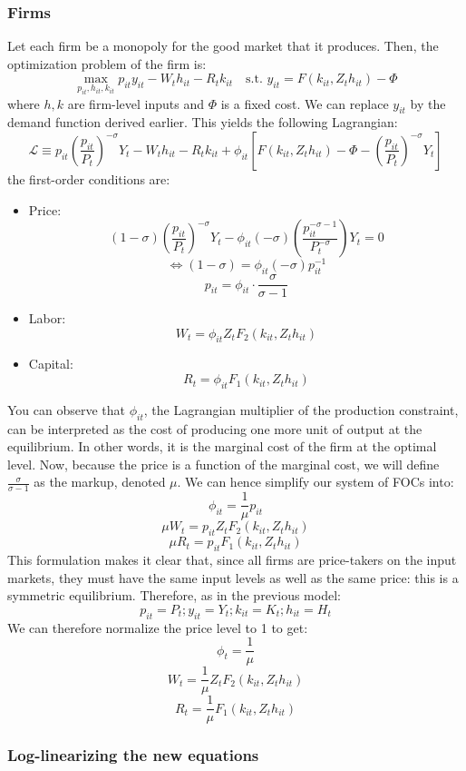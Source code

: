 \documentclass[12pt]{report}
\begin{document}
\subsubsection{Firms}

Let each firm be a monopoly for the good market that it produces. Then, the optimization problem of the firm is: $$\max_{p_{it},h_{it},k_{it}} p_{it}y_{it} - W_th_{it} - R_tk_{it} \text{ }\text{ s.t. } y_{it} = F(k_{it}, Z_th_{it}) - \Phi $$ where $h,k$ are firm-level inputs and $\Phi$ is a fixed cost. We can replace $y_{it}$ by the demand function derived earlier. This yields the following Lagrangian: $$\mathcal{L}\equiv p_{it}\left(\frac{p_{it}}{P_t}\right)^{-\sigma}Y_t - W_th_{it} - R_tk_{it} +\phi_{it}\left[F(k_{it}, Z_th_{it}) - \Phi - \left(\frac{p_{it}}{P_t}\right)^{-\sigma}Y_t\right] $$
the first-order conditions are:\begin{itemize}
\item Price: $$(1 - \sigma)\left(\frac{p_{it}}{P_t}\right)^{-\sigma}Y_t - \phi_{it}(-\sigma)\left(\frac{p_{it}^{-\sigma - 1}}{P_t^{-\sigma}}\right)Y_t = 0 $$ $$\Leftrightarrow (1-\sigma) = \phi_{it}(-\sigma)p_{it}^{-1} $$ $$ p_{it} = \phi_{it}\cdot\frac{\sigma}{\sigma - 1} $$
\item Labor: $$W_t = \phi_{it}Z_tF_2(k_{it}, Z_th_{it}) $$
\item Capital: $$R_t = \phi_{it}F_1(k_{it}, Z_th_{it}) $$
\end{itemize} 
You can observe that $\phi_{it}$, the Lagrangian multiplier of the production constraint, can be interpreted as the cost of producing one more unit of output at the equilibrium. In other words, it is the marginal cost of the firm at the optimal level. Now, because the price is a function of the marginal cost, we will define $\frac{\sigma}{\sigma - 1}$ as the markup, denoted $\mu$. We can hence simplify our system of FOCs into: $$\phi_{it} = \frac{1}{\mu} p_{it} $$ $$\mu W_t = p_{it}Z_tF_2(k_{it}, Z_th_{it}) $$ $$\mu R_t = p_{it}F_1(k_{it}, Z_th_{it}) $$ This formulation makes it clear that, since all firms are price-takers on the input markets, they must have the same input levels as well as the same price: this is a symmetric equilibrium. Therefore, as in the previous model: $$p_{it} = P_t; y_{it} = Y_t ; k_{it} = K_t ; h_{it} = H_t $$ We can therefore normalize the price level to 1 to get: $$\phi_t = \frac{1}{\mu} $$ $$W_t = \frac{1}{\mu} Z_tF_2(k_{it}, Z_th_{it}) $$ $$R_t = \frac{1}{\mu} F_1(k_{it}, Z_th_{it}) $$

\subsubsection{Log-linearizing the new equations}
\end{document}
